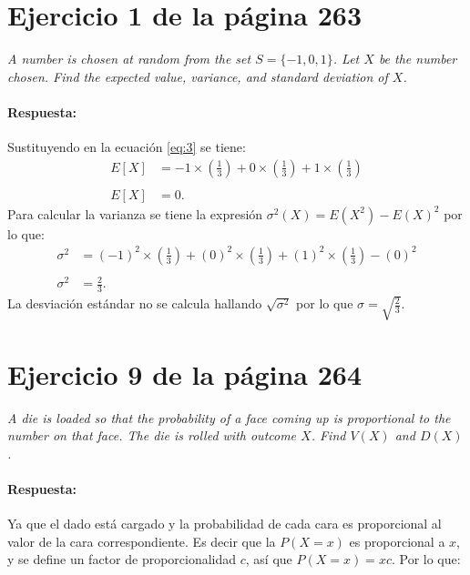 \documentclass{article}
\begin{document}
\section{Ejercicio 1 de la página 263}   
 \emph{A number is chosen at random from the set \( S = \lbrace -1, 0, 1 \rbrace \). Let \(X\) be the number chosen. Find the expected value, variance, and standard deviation of \(X\).}
 
\paragraph{Respuesta:}Sustituyendo en la ecuación \ref{eq:3} se tiene:
\begin{equation}
\begin{array}{ll}
   E[X] &= -1\times \left(\frac{1}{3}\right) + 0\times \left(\frac{1}{3}\right)+1\times \left(\frac{1}{3}\right)\\
   &\\
   E[X] & = 0. 
     \end{array}
   \end{equation}
Para calcular la varianza se tiene la expresión $\sigma ^{2}(X)= E(X^{2})-E(X)^{2}$ por lo que:   
  \begin{equation}
\begin{array}{ll}
   \sigma ^{2} &= (-1)^{2}\times \left(\frac{1}{3}\right) + (0)^{2}\times \left(\frac{1}{3}\right)+(1)^{2}\times \left(\frac{1}{3}\right) -(0)^{2}\\
   &\\
   \sigma ^{2} & = \frac{2}{3}. 
   
     \end{array}
   \end{equation}
   La desviación estándar no se calcula hallando $\sqrt{\sigma ^{2}} $ por lo que $\sigma =\sqrt{\frac{2}{3}}$.
   
\section{Ejercicio 9 de la página 264}      
   \emph{A die is loaded so that the probability of a face coming up is proportional to the number on that face. The die is rolled with outcome $X$. Find $V(X)$ and $D(X)$.}
   
\paragraph{Respuesta:}  Ya que el dado está cargado y la probabilidad de cada cara es proporcional al valor de la cara correspondiente. Es decir que la $P(X=x)$ es proporcional a $x$, y se define un factor de proporcionalidad $c$, así que $P(X=x)=xc$. Por lo que:
\end{document}
